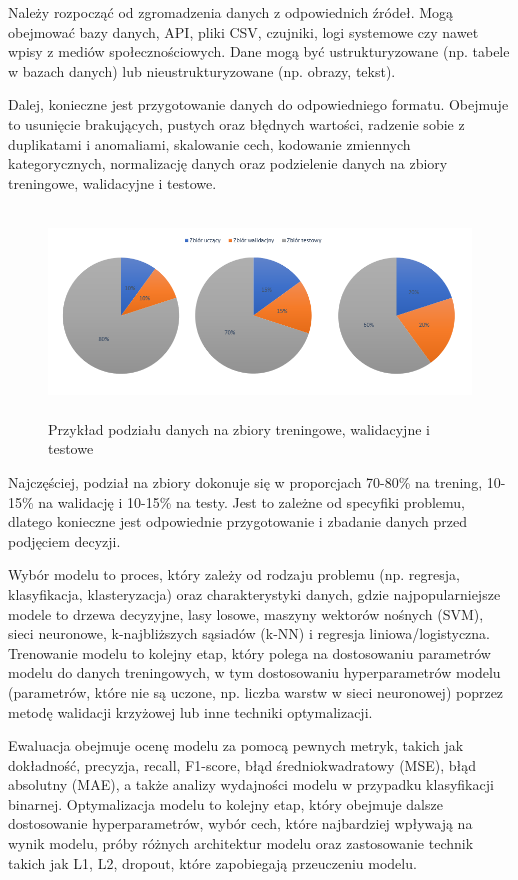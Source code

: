 Należy rozpocząć od zgromadzenia danych z odpowiednich źródeł.
Mogą obejmować bazy danych, API, pliki CSV, czujniki, logi systemowe czy nawet wpisy z mediów społecznościowych.
Dane mogą być ustrukturyzowane (np. tabele w bazach danych) lub nieustrukturyzowane (np. obrazy, tekst).

Dalej, konieczne jest przygotowanie danych do odpowiedniego formatu.
Obejmuje to usunięcie brakujących, pustych oraz błędnych wartości,
radzenie sobie z duplikatami i anomaliami, skalowanie cech, kodowanie zmiennych kategorycznych,
normalizację danych oraz podzielenie danych na zbiory treningowe, walidacyjne i testowe.

\begin{figure}[ht]
	\centering
	\includegraphics[height=5.5cm]{partials/images/machine_learning_process_1.png}
	\caption{Przykład podziału danych na zbiory treningowe, walidacyjne i testowe}
\label{Fig:MachineLearningProcess1}
\end{figure}

Najczęściej, podział na zbiory dokonuje się w proporcjach 70-80\% na trening, 10-15\% na walidację i 10-15\% na testy.
Jest to zależne od specyfiki problemu,
dlatego konieczne jest odpowiednie przygotowanie i zbadanie danych przed podjęciem decyzji.

Wybór modelu to proces, który zależy od rodzaju problemu (np. regresja, klasyfikacja, klasteryzacja)
oraz charakterystyki danych, gdzie najpopularniejsze modele to drzewa decyzyjne,
lasy losowe, maszyny wektorów nośnych (SVM), sieci neuronowe, k-najbliższych sąsiadów (k-NN)
i regresja liniowa/logistyczna. Trenowanie modelu to kolejny etap,
który polega na dostosowaniu parametrów modelu do danych treningowych,
w tym dostosowaniu hyperparametrów modelu (parametrów, które nie są uczone,
np. liczba warstw w sieci neuronowej) poprzez metodę walidacji krzyżowej lub inne techniki optymalizacji.

Ewaluacja obejmuje ocenę modelu za pomocą pewnych metryk,
takich jak dokładność, precyzja, recall, F1-score, błąd średniokwadratowy (MSE),
błąd absolutny (MAE), a także analizy wydajności modelu w przypadku klasyfikacji binarnej.
Optymalizacja modelu to kolejny etap, który obejmuje dalsze dostosowanie hyperparametrów,
wybór cech, które najbardziej wpływają na wynik modelu,
próby różnych architektur modelu oraz zastosowanie technik takich jak L1, L2, dropout,
które zapobiegają przeuczeniu modelu.

